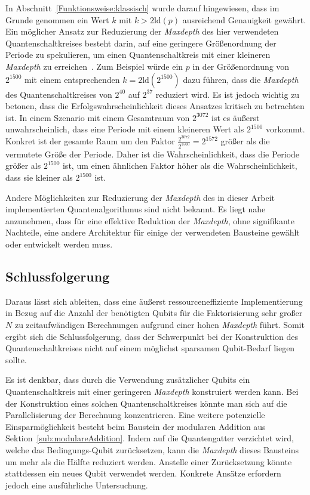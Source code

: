 In Abschnitt~\ref{Funktionsweise:klassisch} wurde darauf hingewiesen, 
dass im Grunde genommen ein Wert \(k\) mit \(k > 2\text{ld}(p)\) ausreichend Genauigkeit gewährt.
Ein möglicher Ansatz zur Reduzierung der \textit{Maxdepth} des hier verwendeten Quantenschaltkreises besteht darin, 
auf eine geringere Größenordnung der Periode zu spekulieren, 
um einen Quantenschaltkreis mit einer kleineren \textit{Maxdepth} zu erreichen~\cite{Shor_1997}. 
Zum Beispiel würde ein \(p\) in der Größenordnung von \(2^{1500}\) mit einem entsprechenden \(k = 2\text{ld}(2^{1500})\) dazu führen, 
dass die \textit{Maxdepth} des Quantenschaltkreises von \(2^{40}\) auf \(2^{37}\) reduziert wird. 
Es ist jedoch wichtig zu betonen, dass die Erfolgswahrscheinlichkeit dieses Ansatzes kritisch zu betrachten ist. 
In einem Szenario mit einem Gesamtraum von \(2^{3072}\) ist es äußerst unwahrscheinlich, 
dass eine Periode mit einem kleineren Wert als \(2^{1500}\) vorkommt.
Konkret ist der gesamte Raum um den Faktor \(\frac{2^{3072}}{2^{1500}} = 2^{1572}\) größer als die vermutete Größe der Periode. 
Daher ist die Wahrscheinlichkeit, dass die Periode größer als \(2^{1500}\) ist, 
um einen ähnlichen Faktor höher als die Wahrscheinlichkeit, 
dass sie kleiner als \(2^{1500}\) ist.

\vspace{1em}

Andere Möglichkeiten zur Reduzierung der \textit{Maxdepth} des in dieser Arbeit implementierten Quantenalgorithmus sind nicht bekannt. 
Es liegt nahe anzunehmen, dass für eine effektive Reduktion der \textit{Maxdepth}, ohne signifikante Nachteile, 
eine andere Architektur für einige der verwendeten Bausteine gewählt oder entwickelt werden muss.

\subsection*{Schlussfolgerung}

Daraus lässt sich ableiten, 
dass eine äußerst ressourceneffiziente Implementierung in Bezug auf die Anzahl der benötigten Qubits für die Faktorisierung 
sehr großer \(N\) zu zeitaufwändigen Berechnungen aufgrund einer hohen \textit{Maxdepth} führt. 
Somit ergibt sich die Schlussfolgerung, 
dass der Schwerpunkt bei der Konstruktion des Quantenschaltkreises nicht auf einem möglichst sparsamen Qubit-Bedarf liegen sollte.

Es ist denkbar, dass durch die Verwendung zusätzlicher Qubits ein Quantenschaltkreis mit einer geringeren \textit{Maxdepth} konstruiert werden kann. 
Bei der Konstruktion eines solchen Quantenschaltkreises könnte man sich auf die Parallelisierung der Berechnung konzentrieren. 
Eine weitere potenzielle Einsparmöglichkeit besteht beim Baustein der modularen Addition aus Sektion~\ref{sub:modulareAddition}.
Indem auf die Quantengatter verzichtet wird, 
welche das Bedingungs-Qubit zurücksetzen, 
kann die \textit{Maxdepth} dieses Bausteins um mehr als die Hälfte reduziert werden. 
Anstelle einer Zurücksetzung könnte stattdessen ein neues Qubit verwendet werden. 
Konkrete Ansätze erfordern jedoch eine ausführliche Untersuchung.



